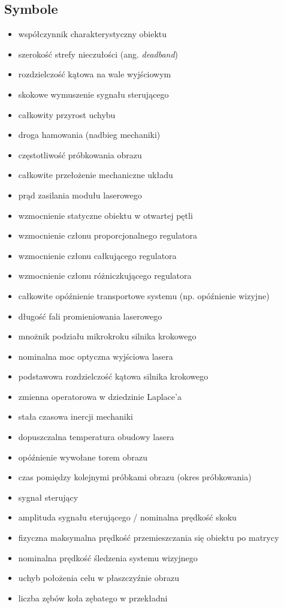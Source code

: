 \documentclass[a4paper,twoside,12pt]{book}
\newcommand{\obcy}[1]{\emph{#1}}
\newcommand{\english}[1]{{\selectlanguage{british}\obcy{#1}}}
\begin{document}
\begin{appendices}
\section*{Symbole}
\begin{itemize}
\item[$a$] współczynnik charakterystyczny obiektu
\item[$d$] szerokość strefy nieczułości (ang. \english{deadband})
\item[$\Delta\theta$] rozdzielczość kątowa na wale wyjściowym
\item[$\Delta u$] skokowe wymuszenie sygnału sterującego
\item[$\Delta y$] całkowity przyrost uchybu
\item[$\Delta y_{stop}$] droga hamowania (nadbieg mechaniki)
\item[$f_{s}$] częstotliwość próbkowania obrazu
\item[$i$] całkowite przełożenie mechaniczne układu
\item[$I_{F}$] prąd zasilania modułu laserowego
\item[$k$] wzmocnienie statyczne obiektu w otwartej pętli
\item[$K_{p}$] wzmocnienie członu proporcjonalnego regulatora
\item[$K_{i}$] wzmocnienie członu całkującego regulatora
\item[$K_{d}$] wzmocnienie członu różniczkującego regulatora
\item[$L$] całkowite opóźnienie transportowe systemu (np. opóźnienie wizyjne)
\item[$\lambda$] długość fali promieniowania laserowego
\item[$\mu$] mnożnik podziału mikrokroku silnika krokowego
\item[$P_{o}$] nominalna moc optyczna wyjściowa lasera
\item[$S$] podstawowa rozdzielczość kątowa silnika krokowego
\item[$s$] zmienna operatorowa w dziedzinie Laplace'a
\item[$T$] stała czasowa inercji mechaniki
\item[$T_{c}$] dopuszczalna temperatura obudowy lasera
\item[$T_{d}$] opóźnienie wywołane torem obrazu
\item[$T_{s}$] czas pomiędzy kolejnymi próbkami obrazu (okres próbkowania)
\item[$u$] sygnał sterujący
\item[$U_{max}$] amplituda sygnału sterującego / nominalna prędkość skoku
\item[$v_{max}$] fizyczna maksymalna prędkość przemieszczania się obiektu po matrycy
\item[$v_{sys}$] nominalna prędkość śledzenia systemu wizyjnego
\item[$y$] uchyb położenia celu w płaszczyźnie obrazu
\item[$z$] liczba zębów koła zębatego w przekładni
\end{itemize}


\end{appendices}
\end{document}
